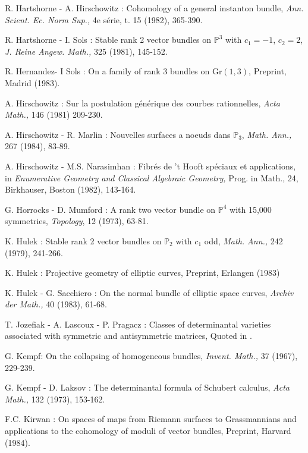 \begin{thebibliography}{}
 R. Hartshorne - A. Hirschowitz : Cohomology of a general instanton bundle, {\em Ann. Scient. Ec. Norm Sup.,} 4e s\'erie, t. 15 (1982), 365-390.  

 R. Hartshorne - I. Sols : Stable rank 2 vector bundles on $\mathbb{P}^{3}$ with $c_{1}=-1$, $c_{2}=2$, {\em J. Reine Angew. Math.,} 325 (1981), 145-152.

 R. Hernandez\pageoriginale - I Sols : On a family of rank 3 bundles on $\text{Gr}(1,3)$, Preprint, Madrid (1983).

 A. Hirschowitz : Sur la postulation g\'en\'erique des courbes rationnelles, {\em Acta Math.,} 146 (1981) 209-230. 

 A. Hirschowitz - R. Marlin : Nouvelles surfaces a noeuds dans $\mathbb{P}_{3}$, {\em Math. Ann.,} 267 (1984), 83-89.

 A. Hirschowitz - M.S. Narasimhan : Fibr\'es de 't Hooft sp\'eciaux et applications, in {\em Enumerative Geometry and Classical Algebraic Geometry,} Prog. in Math., 24, Birkhauser, Boston (1982), 143-164.

 G. Horrocks - D. Mumford : A rank two vector bundle on $\mathbb{P}^{4}$ with 15,000 symmetries, {\em Topology}, 12 (1973), 63-81.

 K. Hulek : Stable rank 2 vector bundles on $\mathbb{P}_{2}$ with $c_{1}$ odd, {\em Math. Ann.,} 242 (1979), 241-266.

 K. Hulek : Projective geometry of elliptic curves, Preprint, Erlangen (1983) 

 K. Hulek - G. Sacchiero : On the normal bundle of elliptic space curves, {\em Archiv der Math.,} 40 (1983), 61-68. 

  T. Jozefiak - A. Lascoux - P. Pragacz : Classes of determinantal varieties associated with symmetric and antisymmetric matrices, Quoted in \cite{chap6-B4}.

 G. Kempf\pageoriginale : On the collapsing of homogeneous bundles, {\em Invent. Math.,} 37 (1967), 229-239.

 G. Kempf - D. Laksov : The determinantal formula of Schubert calculus, {\em Acta Math.,} 132 (1973), 153-162.

 F.C. Kirwan : On spaces of maps from Riemann surfaces to Grassmannians and applications to the cohomology of moduli of vector bundles, Preprint, Harvard (1984).


\end{thebibliography}

